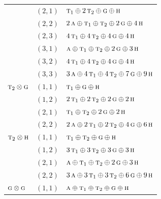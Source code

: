 \documentclass[11pt]{article}
\newcommand{\irr}[1]{\text{\normalfont\scshape #1}}
\begin{document}
\begin{longtable}{p{} c p{}}
 & $(2,1)$ & $\irr{t}_{1}\oplus 2\,\irr{t}_{2}\oplus \irr{g}\oplus \irr{h}$\\

 & $(2,2)$ & $2\,\irr{a}\oplus \irr{t}_{1}\oplus \irr{t}_{2}\oplus 2\,\irr{g}\oplus 4\,\irr{h}$\\

 & $(2,3)$ & $4\,\irr{t}_{1}\oplus 4\,\irr{t}_{2}\oplus 4\,\irr{g}\oplus 4\,\irr{h}$\\

 & $(3,1)$ & $\irr{a}\oplus \irr{t}_{1}\oplus \irr{t}_{2}\oplus 2\,\irr{g}\oplus 3\,\irr{h}$\\

 & $(3,2)$ & $4\,\irr{t}_{1}\oplus 4\,\irr{t}_{2}\oplus 4\,\irr{g}\oplus 4\,\irr{h}$\\

 & $(3,3)$ & $3\,\irr{a}\oplus 4\,\irr{t}_{1}\oplus 4\,\irr{t}_{2}\oplus 7\,\irr{g}\oplus 9\,\irr{h}$\\

\hline

$\irr{t}_{2}\otimes \irr{g}$ & $(1,1)$ & $\irr{t}_{1}\oplus \irr{g}\oplus \irr{h}$\\

 & $(1,2)$ & $2\,\irr{t}_{1}\oplus 2\,\irr{t}_{2}\oplus 2\,\irr{g}\oplus 2\,\irr{h}$\\

 & $(2,1)$ & $\irr{t}_{1}\oplus \irr{t}_{2}\oplus 2\,\irr{g}\oplus 2\,\irr{h}$\\

 & $(2,2)$ & $2\,\irr{a}\oplus 2\,\irr{t}_{1}\oplus 2\,\irr{t}_{2}\oplus 4\,\irr{g}\oplus 6\,\irr{h}$\\

\hline

$\irr{t}_{2}\otimes \irr{h}$ & $(1,1)$ & $\irr{t}_{1}\oplus \irr{t}_{2}\oplus \irr{g}\oplus \irr{h}$\\

 & $(1,2)$ & $3\,\irr{t}_{1}\oplus 3\,\irr{t}_{2}\oplus 3\,\irr{g}\oplus 3\,\irr{h}$\\

 & $(2,1)$ & $\irr{a}\oplus \irr{t}_{1}\oplus \irr{t}_{2}\oplus 2\,\irr{g}\oplus 3\,\irr{h}$\\

 & $(2,2)$ & $3\,\irr{a}\oplus 3\,\irr{t}_{1}\oplus 3\,\irr{t}_{2}\oplus 6\,\irr{g}\oplus 9\,\irr{h}$\\

\hline

$\irr{g}\otimes \irr{g}$ & $(1,1)$ & $\irr{a}\oplus \irr{t}_{1}\oplus \irr{t}_{2}\oplus \irr{g}\oplus \irr{h}$\\


\end{longtable}
\end{document}
